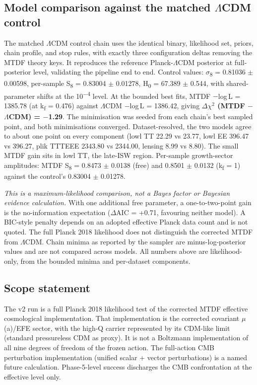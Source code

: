 \documentclass[11pt,a4paper]{article}
\begin{document}
\subsection{Model comparison against the matched $\Lambda$CDM control}
The matched $\Lambda$CDM control chain uses the identical binary, likelihood set, priors, chain profile, and stop rules, with exactly three configuration deltas removing the MTDF theory keys. It reproduces the reference Planck-$\Lambda$CDM posterior at full-posterior level, validating the pipeline end to end. Control values: $\sigma$\textsubscript{8} = 0.81036 $\pm$ 0.00598, per-sample S\textsubscript{8} = 0.83004 $\pm$ 0.01278, H\textsubscript{0} = 67.389 $\pm$ 0.544, with shared-parameter shifts at the 10\textsuperscript{$-$4} level. At the bounded best fits, MTDF $-$log\,L = 1385.78 (at k\textsubscript{f} = 0.476) against $\Lambda$CDM $-$log\,L = 1386.42, giving \textbf{$\Delta$$\chi$$^{2}$ (MTDF $-$ $\Lambda$CDM) = $-$1.29}. The minimisation was seeded from each chain's best sampled point, and both minimisations converged. Dataset-resolved, the two models agree to about one point on every component (lowl TT 22.29 vs 23.77, lowl EE 396.47 vs 396.27, plik TTTEEE 2343.80 vs 2344.00, lensing 8.99 vs 8.80). The small MTDF gain sits in lowl TT, the late-ISW region. Per-sample growth-sector amplitudes: MTDF S\textsubscript{8} = 0.8473 $\pm$ 0.0138 (free) and 0.8501 $\pm$ 0.0132 (k\textsubscript{f} = 1) against the control's 0.83004 $\pm$ 0.01278.

\emph{This is a maximum-likelihood comparison, not a Bayes factor or Bayesian evidence calculation.} With one additional free parameter, a one-to-two-point gain is the no-information expectation ($\Delta$AIC = +0.71, favouring neither model). A BIC-style penalty depends on an adopted effective Planck data count and is not quoted. The full Planck 2018 likelihood does not distinguish the corrected MTDF from $\Lambda$CDM. Chain minima as reported by the sampler are minus-log-posterior values and are not compared across models. All numbers above are likelihood-only, from the bounded minima and per-dataset components.

\subsection{Scope statement}
The v2 run is a full Planck 2018 likelihood test of the corrected MTDF effective cosmological implementation. That implementation is the corrected covariant $\mu$(a)/\allowbreak{}EFE sector, with the high-Q carrier represented by its CDM-like limit (standard pressureless CDM as proxy). It is not a Boltzmann implementation of all nine degrees of freedom of the frozen action. The full-action CMB perturbation implementation (unified scalar + vector perturbations) is a named future calculation. Phase-5-level success discharges the CMB confrontation at the effective level only.
\end{document}
